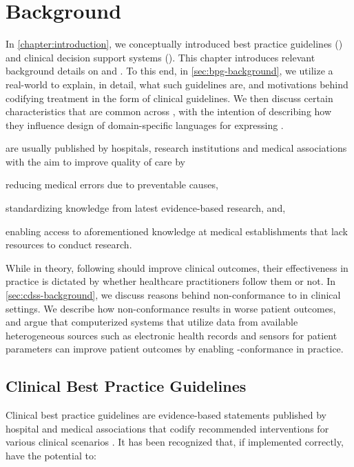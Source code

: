 \chapter{Background}\label{chapter:background}

In \autoref{chapter:introduction}, we conceptually introduced
best practice guidelines (\BPGs{}) and
clinical decision support systems (\CDSSs{}).
This chapter introduces relevant background details
on \BPGs{} and \CDSSs{}.
To this end, in \autoref{sec:bpg-background}, we utilize a real-world \BPG{}
to explain, in detail, what such guidelines are,
and motivations behind codifying treatment
in the form of clinical guidelines. We then discuss
certain characteristics that are common across \BPGs{},
with the intention of describing how they influence
design of domain-specific languages for expressing \BPGLogic{}.

\BPGs{} are usually published by hospitals,
research institutions and medical associations with the aim to improve quality of care by
\begin{enumerate*}[label=(\alph*)]
  \item reducing medical errors due to preventable causes,
  \item standardizing knowledge from latest evidence-based research, and,
  \item enabling access to aforementioned knowledge at medical establishments
  that lack resources to conduct research.
\end{enumerate*}

While in theory, following \BPGs{} should improve clinical outcomes,
their effectiveness in practice is dictated by whether healthcare practitioners
follow them or not. In \autoref{sec:cdss-background}, we discuss reasons behind
non-conformance to \BPGs{} in clinical settings. We describe how
non-conformance results in worse patient outcomes, and
argue that computerized systems that utilize data from available
heterogeneous sources such as electronic health records and sensors for
patient parameters can improve patient outcomes by enabling
\BPG{}-conformance in practice.

\section{Clinical Best Practice Guidelines}\label{sec:bpg-background}

Clinical best practice guidelines are evidence-based statements
published by hospital and medical associations that codify recommended
interventions for various clinical scenarios \cite{field1990clinical}.
It has been recognized that, if implemented correctly, \BPGs{} have the potential to:

